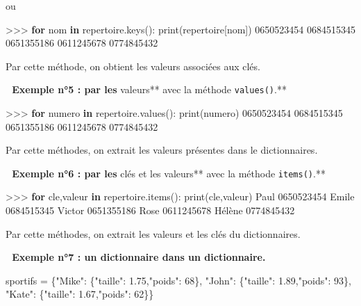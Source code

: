 \documentclass[
]{article}
\newenvironment{Shaded}{}{}
\newcommand{\BuiltInTok}[1]{#1}
\newcommand{\ControlFlowTok}[1]{\textcolor[rgb]{0.00,0.44,0.13}{\textbf{#1}}}
\newcommand{\DecValTok}[1]{\textcolor[rgb]{0.25,0.63,0.44}{#1}}
\newcommand{\FloatTok}[1]{\textcolor[rgb]{0.25,0.63,0.44}{#1}}
\newcommand{\KeywordTok}[1]{\textcolor[rgb]{0.00,0.44,0.13}{\textbf{#1}}}
\newcommand{\NormalTok}[1]{#1}
\newcommand{\OperatorTok}[1]{\textcolor[rgb]{0.40,0.40,0.40}{#1}}
\newcommand{\StringTok}[1]{\textcolor[rgb]{0.25,0.44,0.63}{#1}}
\begin{document}
ou

\begin{Shaded}
\begin{Highlighting}[]
\OperatorTok{\textgreater{}\textgreater{}\textgreater{}} \ControlFlowTok{for}\NormalTok{ nom }\KeywordTok{in}\NormalTok{ repertoire.keys():}
        \BuiltInTok{print}\NormalTok{(repertoire[nom])}
\NormalTok{0650523454}
\NormalTok{0684515345}
\NormalTok{0651355186}
\NormalTok{0611245678}
\NormalTok{0774845432}
\end{Highlighting}
\end{Shaded}

Par cette méthode, on obtient les valeurs associées aux clés.

\textbf{📎 Exemple n°5 : par les }valeurs** avec la méthode
\texttt{values()}.**

\begin{Shaded}
\begin{Highlighting}[]
\OperatorTok{\textgreater{}\textgreater{}\textgreater{}} \ControlFlowTok{for}\NormalTok{ numero }\KeywordTok{in}\NormalTok{ repertoire.values():}
        \BuiltInTok{print}\NormalTok{(numero)}
\NormalTok{0650523454}
\NormalTok{0684515345}
\NormalTok{0651355186}
\NormalTok{0611245678}
\NormalTok{0774845432}
\end{Highlighting}
\end{Shaded}

Par cette méthodes, on extrait les valeurs présentes dans le
dictionnaires.

\textbf{📎 Exemple n°6 : par les }clés et les valeurs** avec la méthode
\texttt{items()}.**

\begin{Shaded}
\begin{Highlighting}[]
\OperatorTok{\textgreater{}\textgreater{}\textgreater{}} \ControlFlowTok{for}\NormalTok{ cle,valeur }\KeywordTok{in}\NormalTok{ repertoire.items():}
        \BuiltInTok{print}\NormalTok{(cle,valeur)}
\NormalTok{Paul 0650523454}
\NormalTok{Emile 0684515345}
\NormalTok{Victor 0651355186}
\NormalTok{Rose 0611245678}
\NormalTok{Hélène 0774845432}
\end{Highlighting}
\end{Shaded}

Par cette méthodes, on extrait les valeurs et les clés du dictionnaires.

\textbf{📎 Exemple n°7 : un dictionnaire dans un dictionnaire.}

\begin{Shaded}
\begin{Highlighting}[]
\NormalTok{sportifs }\OperatorTok{=}\NormalTok{ \{}\StringTok{"Mike"}\NormalTok{: \{}\StringTok{"taille"}\NormalTok{: }\FloatTok{1.75}\NormalTok{,}\StringTok{"poids"}\NormalTok{: }\DecValTok{68}\NormalTok{\}, }\StringTok{"John"}\NormalTok{: \{}\StringTok{"taille"}\NormalTok{: }\FloatTok{1.89}\NormalTok{,}\StringTok{"poids"}\NormalTok{: }\DecValTok{93}\NormalTok{\}, }\StringTok{"Kate"}\NormalTok{: \{}\StringTok{"taille"}\NormalTok{: }\FloatTok{1.67}\NormalTok{,}\StringTok{"poids"}\NormalTok{: }\DecValTok{62}\NormalTok{\}\}}
\end{Highlighting}
\end{Shaded}
\end{document}
